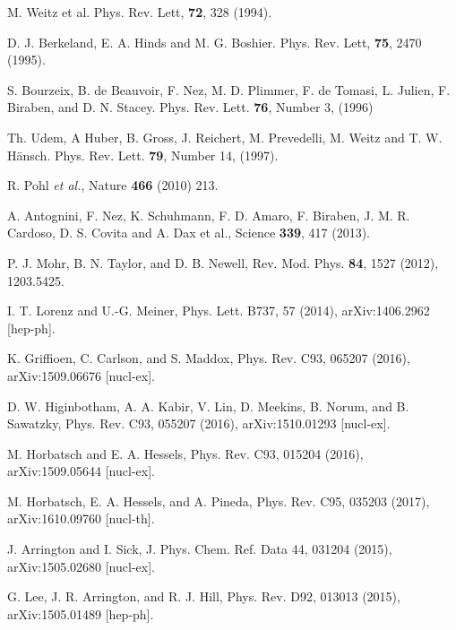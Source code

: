 \documentclass[aps,prd,twocolumn,groupedaddress,10pt]{revtex4-1}
\begin{document}
\begin{thebibliography}{99}
  M. Weitz et al. Phys. Rev. Lett, {\bf72}, 328 (1994).
  
  D. J. Berkeland, E. A. Hinds and M. G. Boshier. Phys. Rev. Lett, {\bf75}, 2470 (1995).
  
  S. Bourzeix, B. de Beauvoir, F. Nez, M. D. Plimmer, F. de Tomasi, L. Julien, F. Biraben, and D. N. Stacey.
  Phys. Rev. Lett. {\bf76}, Number 3, (1996)
  
  Th. Udem, A Huber, B. Gross, J. Reichert, M. Prevedelli, M. Weitz and T. W. H\"{a}nsch.
  Phys. Rev. Lett. {\bf79}, Number 14, (1997).
  
 
  
   R. Pohl \emph{et al.}, Nature {\bf 466} (2010) 213.
   
   A. Antognini, F. Nez, K. Schuhmann, F. D. Amaro, F. Biraben, J. M. R. Cardoso,
	D. S. Covita and A. Dax et al., Science {\bf 339}, 417 (2013).
	
  P. J. Mohr, B. N. Taylor, and D. B. Newell, Rev. Mod. Phys. {\bf 84}, 1527 (2012), 1203.5425.
		
	 I. T. Lorenz and U.-G. Meiner, Phys. Lett. B737, 57 (2014), arXiv:1406.2962 [hep-ph].
	 
	 K. Griffioen, C. Carlson, and S. Maddox, Phys. Rev. C93, 065207 (2016), arXiv:1509.06676 [nucl-ex].
	 
	 D. W. Higinbotham, A. A. Kabir, V. Lin, D. Meekins, B. Norum, and B. Sawatzky, Phys. Rev. C93, 055207 (2016),
arXiv:1510.01293 [nucl-ex].

	 M. Horbatsch and E. A. Hessels, Phys. Rev. C93, 015204 (2016), arXiv:1509.05644 [nucl-ex].
	 
	 M. Horbatsch, E. A. Hessels, and A. Pineda, Phys. Rev. C95, 035203 (2017), arXiv:1610.09760 [nucl-th].
	 
	  J. Arrington and I. Sick, J. Phys. Chem. Ref. Data 44, 031204 (2015), arXiv:1505.02680 [nucl-ex].
	  
	  G. Lee, J. R. Arrington, and R. J. Hill, Phys. Rev. D92, 013013 (2015), arXiv:1505.01489 [hep-ph].
	  

\end{thebibliography}
\end{document}
